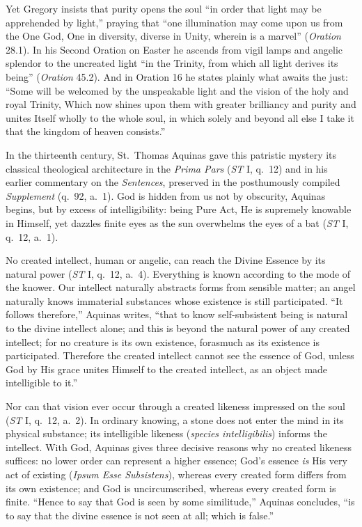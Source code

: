 Yet Gregory insists that purity opens the soul ``in order that light may be apprehended by light,'' praying that ``one illumination may come upon us from the One God, One in diversity, diverse in Unity, wherein is a marvel'' (\textit{Oration} 28.1). In his Second Oration on Easter he ascends from vigil lamps and angelic splendor to the uncreated light ``in the Trinity, from which all light derives its being'' (\textit{Oration} 45.2). And in Oration 16 he states plainly what awaits the just: ``Some will be welcomed by the unspeakable light and the vision of the holy and royal Trinity, Which now shines upon them with greater brilliancy and purity and unites Itself wholly to the whole soul, in which solely and beyond all else I take it that the kingdom of heaven consists.''

In the thirteenth century, St.\ Thomas Aquinas gave this patristic mystery its classical theological architecture in the \textit{Prima Pars} (\textit{ST} I, q.\ 12) and in his earlier commentary on the \textit{Sentences}, preserved in the posthumously compiled \textit{Supplement} (q.\ 92, a.\ 1). God is hidden from us not by obscurity, Aquinas begins, but by excess of intelligibility: being Pure Act, He is supremely knowable in Himself, yet dazzles finite eyes as the sun overwhelms the eyes of a bat (\textit{ST} I, q.\ 12, a.\ 1).

No created intellect, human or angelic, can reach the Divine Essence by its natural power (\textit{ST} I, q.\ 12, a.\ 4). Everything is known according to the mode of the knower. Our intellect naturally abstracts forms from sensible matter; an angel naturally knows immaterial substances whose existence is still participated. ``It follows therefore,'' Aquinas writes, ``that to know self-subsistent being is natural to the divine intellect alone; and this is beyond the natural power of any created intellect; for no creature is its own existence, forasmuch as its existence is participated. Therefore the created intellect cannot see the essence of God, unless God by His grace unites Himself to the created intellect, as an object made intelligible to it.''

Nor can that vision ever occur through a created likeness impressed on the soul (\textit{ST} I, q.\ 12, a.\ 2). In ordinary knowing, a stone does not enter the mind in its physical substance; its intelligible likeness (\textit{species intelligibilis}) informs the intellect. With God, Aquinas gives three decisive reasons why no created likeness suffices: no lower order can represent a higher essence; God's essence \textit{is} His very act of existing (\textit{Ipsum Esse Subsistens}), whereas every created form differs from its own existence; and God is uncircumscribed, whereas every created form is finite. ``Hence to say that God is seen by some similitude,'' Aquinas concludes, ``is to say that the divine essence is not seen at all; which is false.''

